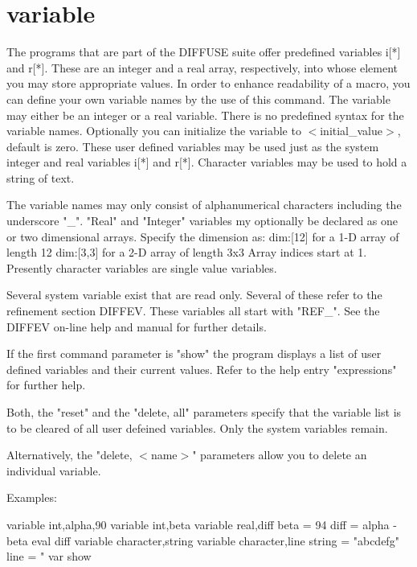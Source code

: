 \section{variable}
\begin{MacVerbatim}
variable {"integer"|"real"},<name> [,<initial_value>] [,dim:[d1,d2]]
variable {"character"},<name>
variable show
variable reset
variable delete {,"all"| <name>..]
\end{MacVerbatim}
The programs that are part of the DIFFUSE suite offer predefined 
variables i[*] and r[*]. These are an integer and a real 
array, respectively, into whose element you may store appropriate 
values. 
In order to enhance readability of a macro, you can define your 
own variable names by the use of this command. The variable may 
either be an integer or a real variable. There is no predefined 
syntax for the variable names. Optionally you can initialize the 
variable to $ <$initial\_value$> $, default is zero. These user defined 
variables may be used just as the system integer and real 
variables i[*] and r[*]. 
Character variables may be used to hold a string of text. 
\par
The variable names may only consist of alphanumerical characters 
including the underscore "\_". 
"Real" and "Integer" variables my optionally be declared as 
one or two dimensional arrays. Specify the dimension as: 
dim:[12]  for a 1-D array of length 12 
dim:[3,3] for a 2-D array of length 3x3 
Array indices start at 1. 
Presently character variables are single value variables. 
\par
Several system variable exist that are read only. Several of 
these refer to the refinement section DIFFEV. These variables 
all start with "REF\_". See the DIFFEV on-line help and manual 
for further details. 
\par
If the first command parameter is "show" the program displays a 
list of user defined variables and their current values. 
Refer to the help entry "expressions" for further help. 
\par
Both, the "reset" and the "delete, all" parameters specify that 
the variable list is to be cleared of all user defeined variables. 
Only the system variables remain. 
\par
Alternatively, the "delete, $ <$name$> $" parameters allow you to delete 
an individual variable. 
\par
Examples: 
\begin{MacVerbatim}
variable  int,alpha,90
variable  int,beta
variable  real,diff
beta = 94
diff = alpha - beta
eval diff
variable  character,string
variable  character,line
string = "abcdefg"
line   = "%
var show
\end{MacVerbatim}

